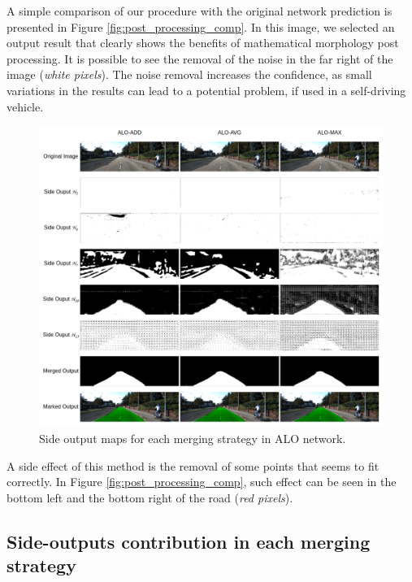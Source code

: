A simple comparison of our procedure with the original network prediction is presented in Figure \ref{fig:post_processing_comp}. In this image, we selected an output result that clearly shows the benefits of mathematical morphology post processing. It is possible to see the removal of the noise in the far right of the image (\textit{white pixels}). The noise removal increases the confidence, as small variations in the results can lead to a potential problem, if used in a self-driving vehicle. 

\begin{figure}
  \centering
  \includegraphics[width=1.0\textwidth]{figures/falreis/side_outputs.png}
  \caption{Side output maps for each merging strategy in ALO network.}
  \label{fig:side_outputs}
\end{figure}



A side effect of this method is the removal of some points that seems to fit correctly. %
In Figure \ref{fig:post_processing_comp}, such effect can be seen in the bottom left and the bottom right of the road (\textit{red pixels}).



\subsection{Side-outputs contribution in each merging strategy}
\label{ssec:merging_learn}

